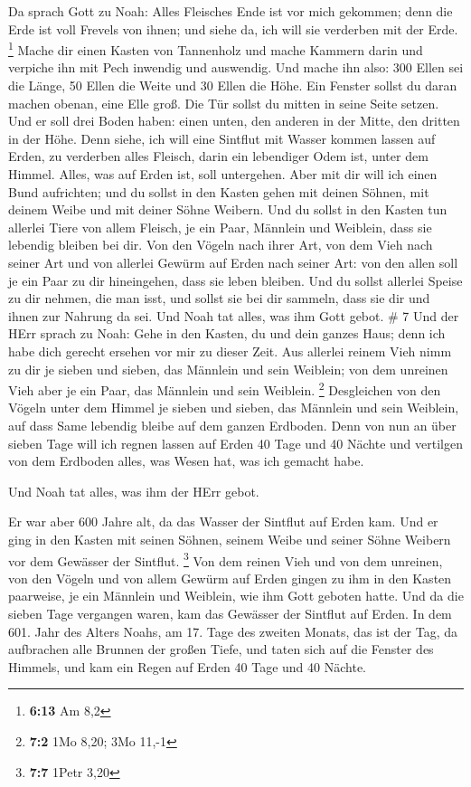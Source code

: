  Da sprach Gott zu Noah: Alles Fleisches Ende ist vor mich
gekommen; denn die Erde ist voll Frevels von ihnen; und siehe da, ich
will sie verderben mit der Erde. \footnote{\textbf{6:13} Am 8,2}
 Mache dir einen Kasten von Tannenholz und mache Kammern
darin und verpiche ihn mit Pech inwendig und auswendig. 
Und mache ihn also: 300 Ellen sei die Länge, 50 Ellen die Weite und 30
Ellen die Höhe.  Ein Fenster sollst du daran machen obenan,
eine Elle groß. Die Tür sollst du mitten in seine Seite setzen. Und er
soll drei Boden haben: einen unten, den anderen in der Mitte, den
dritten in der Höhe.  Denn siehe, ich will eine Sintflut
mit Wasser kommen lassen auf Erden, zu verderben alles Fleisch, darin
ein lebendiger Odem ist, unter dem Himmel. Alles, was auf Erden ist,
soll untergehen.  Aber mit dir will ich einen Bund
aufrichten; und du sollst in den Kasten gehen mit deinen Söhnen, mit
deinem Weibe und mit deiner Söhne Weibern.  Und du sollst
in den Kasten tun allerlei Tiere von allem Fleisch, je ein Paar,
Männlein und Weiblein, dass sie lebendig bleiben bei dir. 
Von den Vögeln nach ihrer Art, von dem Vieh nach seiner Art und von
allerlei Gewürm auf Erden nach seiner Art: von den allen soll je ein
Paar zu dir hineingehen, dass sie leben bleiben.  Und du
sollst allerlei Speise zu dir nehmen, die man isst, und sollst sie bei
dir sammeln, dass sie dir und ihnen zur Nahrung da sei. 
Und Noah tat alles, was ihm Gott gebot. \# 7  Und der HErr
sprach zu Noah: Gehe in den Kasten, du und dein ganzes Haus; denn ich
habe dich gerecht ersehen vor mir zu dieser Zeit.  Aus
allerlei reinem Vieh nimm zu dir je sieben und sieben, das Männlein und
sein Weiblein; von dem unreinen Vieh aber je ein Paar, das Männlein und
sein Weiblein. \footnote{\textbf{7:2} 1Mo 8,20; 3Mo 11,-1} 
Desgleichen von den Vögeln unter dem Himmel je sieben und sieben, das
Männlein und sein Weiblein, auf dass Same lebendig bleibe auf dem ganzen
Erdboden.  Denn von nun an über sieben Tage will ich regnen
lassen auf Erden 40 Tage und 40 Nächte und vertilgen von dem Erdboden
alles, was Wesen hat, was ich gemacht habe.

 Und Noah tat alles, was ihm der HErr gebot.

 Er war aber 600 Jahre alt, da das Wasser der Sintflut auf
Erden kam.  Und er ging in den Kasten mit seinen Söhnen,
seinem Weibe und seiner Söhne Weibern vor dem Gewässer der Sintflut.
\footnote{\textbf{7:7} 1Petr 3,20}  Von dem reinen Vieh und
von dem unreinen, von den Vögeln und von allem Gewürm auf Erden
 gingen zu ihm in den Kasten paarweise, je ein Männlein und
Weiblein, wie ihm Gott geboten hatte.  Und da die sieben
Tage vergangen waren, kam das Gewässer der Sintflut auf Erden.
 In dem 601. Jahr des Alters Noahs, am 17. Tage des zweiten
Monats, das ist der Tag, da aufbrachen alle Brunnen der großen Tiefe,
und taten sich auf die Fenster des Himmels,  und kam ein
Regen auf Erden 40 Tage und 40 Nächte.

